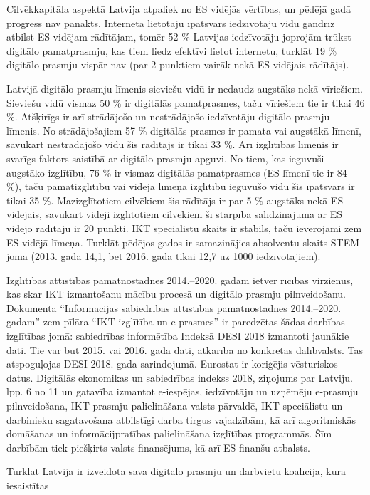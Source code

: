 Cilvēkkapitāla aspektā Latvija atpaliek no ES vidējās vērtības, un pēdējā gadā progress nav
panākts. Interneta lietotāju īpatsvars iedzīvotāju vidū gandrīz atbilst ES vidējam rādītājam,
tomēr 52 \% Latvijas iedzīvotāju joprojām trūkst digitālo pamatprasmju, kas tiem liedz efektīvi
lietot internetu, turklāt 19 \% digitālo prasmju vispār nav (par 2 punktiem vairāk nekā ES
vidējais rādītājs).
\par
Latvijā digitālo prasmju līmenis sieviešu vidū ir nedaudz augstāks nekā vīriešiem. Sieviešu
vidū vismaz 50 \% ir digitālās pamatprasmes, taču vīriešiem tie ir tikai 46 \%. Atšķirīgs ir arī
strādājošo un nestrādājošo iedzīvotāju digitālo prasmju līmenis. No strādājošajiem 57 \%
digitālās prasmes ir pamata vai augstākā līmenī, savukārt nestrādājošo vidū šis rādītājs ir
tikai 33 \%. Arī izglītības līmenis ir svarīgs faktors saistībā ar digitālo prasmju apguvi. No tiem,
kas ieguvuši augstāko izglītību, 76 \% ir vismaz digitālās pamatprasmes (ES līmenī tie ir
84 \%), taču pamatizglītību vai vidēja līmeņa izglītību ieguvušo vidū šis īpatsvars ir tikai 35 \%.
Mazizglītotiem cilvēkiem šis rādītājs ir par 5 \% augstāks nekā ES vidējais, savukārt vidēji
izglītotiem cilvēkiem šī starpība salīdzinājumā ar ES vidējo rādītāju ir 20 punkti. IKT
speciālistu skaits ir stabils, taču ievērojami zem ES vidējā līmeņa. Turklāt pēdējos gados ir
samazinājies absolventu skaits STEM jomā (2013. gadā 14,1, bet 2016. gadā tikai 12,7 uz
1000 iedzīvotājiem).
\par
Izglītības attīstības pamatnostādnes 2014.–2020. gadam ietver rīcības virzienus, kas skar
IKT izmantošanu mācību procesā un digitālo prasmju pilnveidošanu. Dokumentā
“Informācijas sabiedrības attīstības pamatnostādnes 2014.–2020. gadam” zem pīlāra “IKT
izglītība un e-prasmes” ir paredzētas šādas darbības izglītības jomā: sabiedrības informētība
Indeksā DESI 2018 izmantoti jaunākie dati. Tie var būt 2015. vai 2016. gada dati, atkarībā no konkrētās
dalībvalsts. Tas atspoguļojas DESI 2018. gada sarindojumā. Eurostat ir koriģējis vēsturiskos datus.
Digitālās ekonomikas un sabiedrības indekss 2018, ziņojums par Latviju. lpp. 6 no 11
un gatavība izmantot e-iespējas, iedzīvotāju un uzņēmēju e-prasmju pilnveidošana, IKT
prasmju palielināšana valsts pārvaldē, IKT speciālistu un darbinieku sagatavošana atbilstīgi
darba tirgus vajadzībām, kā arī algoritmiskās domāšanas un informācijpratības palielināšana
izglītības programmās. Šīm darbībām tiek piešķirts valsts finansējums, kā arī ES finanšu
atbalsts.
\par
Turklāt Latvijā ir izveidota sava digitālo prasmju un darbvietu koalīcija, kurā iesaistītas
